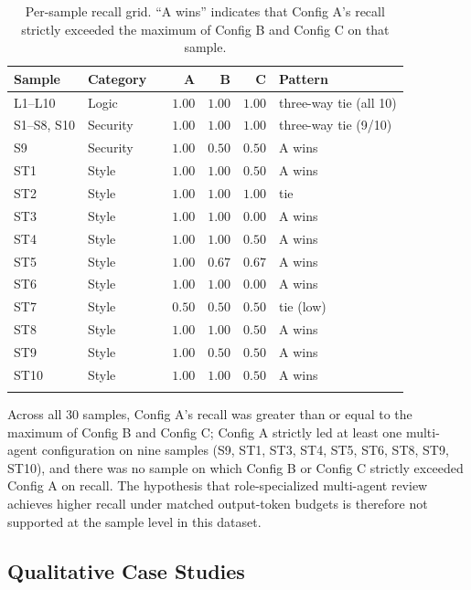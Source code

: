 \documentclass[pdflatex,sn-mathphys-num]{sn-jnl}
\theoremstyle{thmstyleone}
\theoremstyle{thmstyletwo}
\theoremstyle{thmstylethree}
\begin{document}
\begin{table}[ht]
\caption{Per-sample recall grid. ``A wins'' indicates that Config A's recall strictly exceeded the maximum of Config B and Config C on that sample.}
\label{tab:per-sample}
\begin{tabular}{@{}lllrrrl@{}}
\toprule
Sample & Category & & A & B & C & Pattern \\
\midrule
L1--L10        & Logic    & & $1.00$ & $1.00$ & $1.00$ & three-way tie (all 10) \\
S1--S8, S10    & Security & & $1.00$ & $1.00$ & $1.00$ & three-way tie (9/10) \\
S9             & Security & & $1.00$ & $0.50$ & $0.50$ & A wins \\
ST1            & Style    & & $1.00$ & $1.00$ & $0.50$ & A wins \\
ST2            & Style    & & $1.00$ & $1.00$ & $1.00$ & tie \\
ST3            & Style    & & $1.00$ & $1.00$ & $0.00$ & A wins \\
ST4            & Style    & & $1.00$ & $1.00$ & $0.50$ & A wins \\
ST5            & Style    & & $1.00$ & $0.67$ & $0.67$ & A wins \\
ST6            & Style    & & $1.00$ & $1.00$ & $0.00$ & A wins \\
ST7            & Style    & & $0.50$ & $0.50$ & $0.50$ & tie (low) \\
ST8            & Style    & & $1.00$ & $1.00$ & $0.50$ & A wins \\
ST9            & Style    & & $1.00$ & $0.50$ & $0.50$ & A wins \\
ST10           & Style    & & $1.00$ & $1.00$ & $0.50$ & A wins \\
\botrule
\end{tabular}
\end{table}

Across all 30 samples, Config A's recall was greater than or equal to the maximum of Config B and Config C; Config A strictly led at least one multi-agent configuration on nine samples (S9, ST1, ST3, ST4, ST5, ST6, ST8, ST9, ST10), and there was no sample on which Config B or Config C strictly exceeded Config A on recall. The hypothesis that role-specialized multi-agent review achieves higher recall under matched output-token budgets is therefore not supported at the sample level in this dataset.

\subsection{Qualitative Case Studies}
\end{document}

